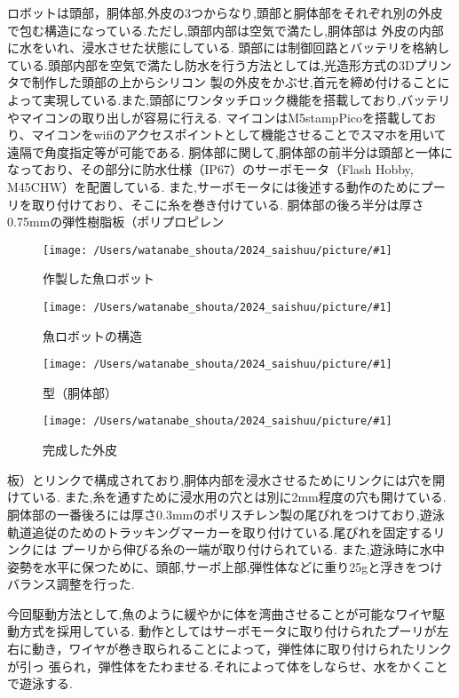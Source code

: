 \documentclass{jarticle}
\newcommand{\setPicture}[1]{\texttt{[image: /Users/watanabe\_shouta/2024\_saishuu/picture/\#1]}}
\begin{document}
ロボットは頭部，胴体部,外皮の3つからなり,頭部と胴体部をそれぞれ別の外皮で包む構造になっている.ただし,頭部内部は空気で満たし,胴体部は
外皮の内部に水をいれ、浸水させた状態にしている.
頭部には制御回路とバッテリを格納している.頭部内部を空気で満たし防水を行う方法としては,光造形方式の3Dプリンタで制作した頭部の上からシリコン
製の外皮をかぶせ,首元を締め付けることによって実現している.また,頭部にワンタッチロック機能を搭載しており,バッテリやマイコンの取り出しが容易に行える.
マイコンはM5stampPicoを搭載しており、マイコンをwifiのアクセスポイントとして機能させることでスマホを用いて遠隔で角度指定等が可能である.
胴体部に関して,胴体部の前半分は頭部と一体になっており、その部分に防水仕様（IP67）のサーボモータ（Flash Hobby, M45CHW）を配置している.
また,サーボモータには後述する動作のためにプーリを取り付けており、そこに糸を巻き付けている.
胴体部の後ろ半分は厚さ0.75mmの弾性樹脂板（ポリプロピレン
\begin{figure}[H]
   \centering
   \setPicture{withskin.jpg}
   \caption{作製した魚ロボット}
   \label{fig:skin}
\end{figure}
\begin{figure}[H]
   \centering
   \setPicture{fish.pdf}
   \caption{魚ロボットの構造}
   \label{fig:structure}
\end{figure}
\begin{figure}[H]
 \begin{minipage}[t]{0.45\linewidth}
   \centering
   \setPicture{katata.jpg}
   \caption{型（胴体部）}
   \label{fig:kata}
 \end{minipage}
 \hspace*{0.05\columnwidth}
 \begin{minipage}[t]{0.45\linewidth}
   \centering
   \setPicture{kawa.jpg}
   \caption{完成した外皮}
   \label{fig:kawa}
 \end{minipage}
\end{figure}
\noindent 板）とリンクで構成されており,胴体内部を浸水させるためにリンクには穴を開けている.
また,糸を通すために浸水用の穴とは別に2mm程度の穴も開けている.
胴体部の一番後ろには厚さ0.3mmのポリスチレン製の尾びれをつけており,遊泳軌道追従のためのトラッキングマーカーを取り付けている.尾びれを固定するリンクには
プーリから伸びる糸の一端が取り付けられている.
また,遊泳時に水中姿勢を水平に保つために、頭部,サーボ上部,弾性体などに重り25gと浮きをつけバランス調整を行った.

今回駆動方法として,魚のように緩やかに体を湾曲させることが可能なワイヤ駆動方式を採用している.
動作としてはサーボモータに取り付けられたプーリが左右に動き，ワイヤが巻き取られることによって，弾性体に取り付けられたリンクが引っ
張られ，弾性体をたわませる.それによって体をしならせ、水をかくことで遊泳する.
\end{document}
